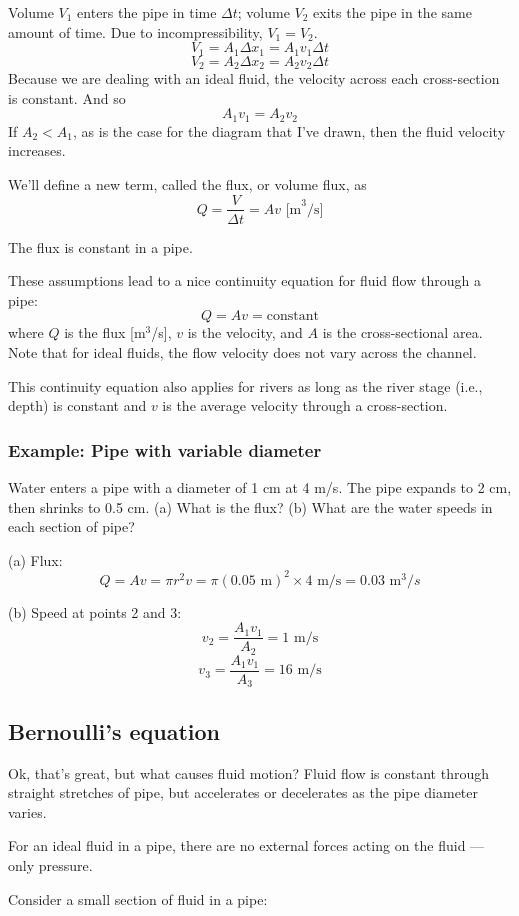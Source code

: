 Volume $V_1$ enters the pipe in time $\Delta{t}$; volume $V_2$ exits the pipe in the same amount of time. Due to incompressibility, $V_1=V_2$.
$$V_1=A_1\Delta{x_1}=A_1v_1\Delta{t}$$
$$V_2=A_2\Delta{x_2}=A_2v_2\Delta{t}$$
Because we are dealing with an ideal fluid, the velocity across each cross-section is constant.
And so
$$\boxed{A_1v_1=A_2v_2}$$
If $A_2<A_1$, as is the case for the diagram that I've drawn, then the fluid velocity increases.

We'll define a new term, called the flux, or volume flux, as 
$$Q=\frac{V}{\Delta{t}}=Av\mbox{ [m}^3\mbox{/s]}$$

The flux is constant in a pipe.

These assumptions lead to a nice continuity equation for fluid flow through a pipe:
$$Q=Av=\mbox{constant}$$
where $Q$ is the flux [m$^3$/s], $v$ is the velocity, and $A$ is the cross-sectional area. Note that for ideal fluids, the flow velocity does not vary across the channel. 

This continuity equation also applies for rivers as long as the river stage (i.e., depth) is constant and $v$ is the average velocity through a cross-section.

\subsubsection{Example: Pipe with variable diameter}
Water enters a pipe with a diameter of 1 cm at 4 m/s. The pipe expands to 2 cm, then shrinks to 0.5 cm. (a) What is the flux? (b) What are the water speeds in each section of pipe?

(a) Flux:
$$Q=Av=\pi r^2v=\pi(0.05\mbox{ m})^2\times 4\mbox{ m/s}=0.03\mbox{ m}^3/s$$

(b) Speed at points 2 and 3:
$$v_2=\frac{A_1v_1}{A_2}=1\mbox{ m/s}$$
$$v_3=\frac{A_1v_1}{A_3}=16\mbox{ m/s}$$


\subsection{Bernoulli's equation}
Ok, that's great, but what causes fluid motion? Fluid flow is constant through straight stretches of pipe, but accelerates or decelerates as the pipe diameter varies.

For an ideal fluid in a pipe, there are no external forces acting on the fluid --- only pressure.

Consider a small section of fluid in a pipe:

\vspace{5cm}

